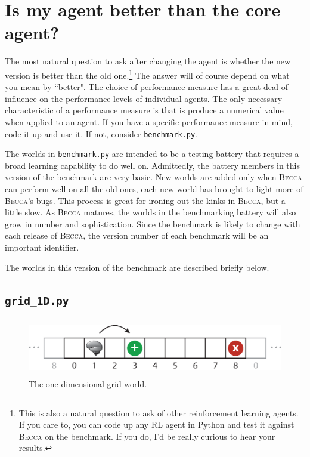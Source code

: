 \section{Is my agent better than the core agent?}
The most natural question to ask after changing the agent is whether the new version is better than the old one.\footnote{This is also a natural question to ask of other reinforcement learning agents. If you care to, you can code up any RL agent in Python and test it against \textsc{Becca} on the benchmark. If you do, I'd be really curious to hear your results.} The answer will of course depend on what you mean by ``better". The choice of performance measure has a great deal of influence on the performance levels of individual agents. The only necessary characteristic of a performance measure is that is produce a numerical value when applied to an agent. If you have a specific performance measure in mind, code it up and use it. If not, consider \texttt{benchmark.py}. 

The worlds in \texttt{benchmark.py} are intended to be a testing battery that requires a broad learning capability to do well on. Admittedly, the battery members in this version of the benchmark are very basic. New worlds are added only when \textsc{Becca} can perform well on all the old ones, each new world has brought to light more of \textsc{Becca}'s bugs. This process is great for ironing out the kinks in \textsc{Becca}, but a little slow. As \textsc{Becca} matures, the worlds in the benchmarking battery will also grow in number and sophistication. Since the benchmark is likely to change with each release of \textsc{Becca}, the version number of each benchmark will be an important identifier.

The worlds in this version of the benchmark are described briefly below.

\subsection{\texttt{grid\_1D.py}}

\begin{figure}
\centering
\includegraphics[height=2.5cm]{figs/grid_world_1D.eps}
\caption{The one-dimensional grid world.}
\label{grid_1D}
\end{figure}

